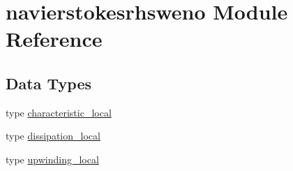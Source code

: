 \hypertarget{namespacenavierstokesrhsweno}{}\section{navierstokesrhsweno Module Reference}
\label{namespacenavierstokesrhsweno}
\subsection*{Data Types}
\begin{DoxyCompactItemize}
\item 
type \hyperlink{structnavierstokesrhsweno_1_1characteristic__local}{characteristic\+\_\+local}
\item 
type \hyperlink{structnavierstokesrhsweno_1_1dissipation__local}{dissipation\+\_\+local}
\item 
type \hyperlink{structnavierstokesrhsweno_1_1upwinding__local}{upwinding\+\_\+local}
\end{DoxyCompactItemize}
